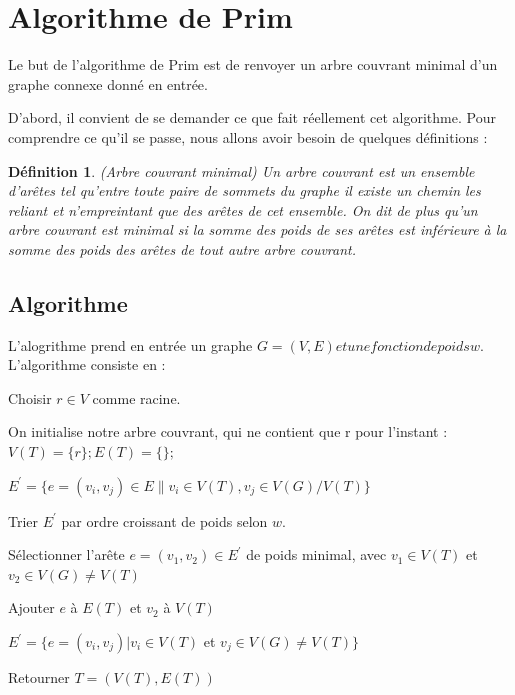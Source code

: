 \documentclass{article}
\newtheorem*{ddef}{Définition}
\begin{document}
\section{Algorithme de Prim}
Le but de l'algorithme de Prim est de renvoyer un arbre couvrant minimal d'un graphe connexe donné en entrée.

D'abord, il convient de se demander ce que fait réellement cet algorithme. Pour comprendre ce qu'il se passe, nous allons avoir besoin de quelques définitions :

\begin{ddef}(Arbre couvrant minimal)
 Un arbre couvrant est un ensemble d'arêtes tel qu'entre toute paire de sommets du graphe il existe un chemin les reliant et n'empreintant que des arêtes de cet
 ensemble.
 On dit de plus qu'un arbre couvrant est minimal si la somme des poids de ses arêtes est inférieure à la somme des poids des arêtes de tout autre arbre couvrant.
\end{ddef}

\subsection{Algorithme}

L'alogrithme prend en entrée un graphe $G = (V, E) et une fonction de poids w$. L'algorithme consiste en :

\begin{algorithmic}

Choisir $r \in V$ comme racine.

On initialise notre arbre couvrant, qui ne contient que r pour l'instant : $V(T) = \{r\} ; E(T) = \{\};$

$E^{\prime} = \{e = (v_{i}, v_{j}) \in E \| v_{i} \in V(T), v_{j} \in V(G)/V(T)\}$

Trier $E^{\prime}$ par ordre croissant de poids selon $w$.


Sélectionner l'arête  $e = (v_1, v_2) \in E^{\prime}$ de poids minimal, avec $v_1 \in V(T)$ et $v_2 \in V(G) \not= V(T)$

Ajouter $e$ à $E(T)$ et $v_2$ à $V(T)$

$E^{\prime} = \{e = (v_i, v_j)| v_i \in V(T)$ et $v_j \in V(G) \neq V(T) \}$

\EndWhile

Retourner $T = (V(T), E(T))$
\end{algorithmic}
\end{document}
